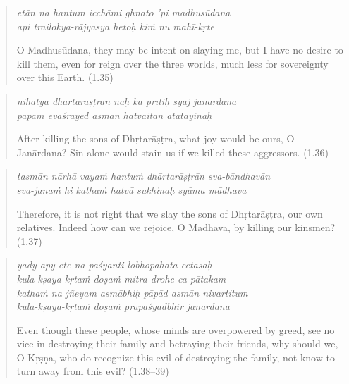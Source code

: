 \documentclass[12pt, twoside, openright]{memoir}
\begin{document}
\par
\begin{verse}
\textit{etān na hantum icchāmi ghnato ’pi madhusūdana} \\
\textit{api trailokya-rājyasya hetoḥ kiṁ nu mahī-kṛte}

\noindent O Madhusūdana, they may be intent on slaying me, but I have no desire to kill them, even for reign over the three worlds, much less for sovereignty over this Earth. (1.35)
\end{verse}
\par



\par
\begin{verse}
\textit{nihatya dhārtarāṣṭrān naḥ kā prītiḥ syāj janārdana} \\
\textit{pāpam evāśrayed asmān hatvaitān ātatāyinaḥ}

\noindent After killing the sons of Dhṛtarāṣṭra, what joy would be ours, O Janārdana? Sin alone would stain us if we killed these aggressors. (1.36)
\end{verse}
\par



\par
\begin{verse}
\textit{tasmān nārhā vayaṁ hantuṁ dhārtarāṣṭrān sva-bāndhavān} \\
\textit{sva-janaṁ hi kathaṁ hatvā sukhinaḥ syāma mādhava}

\noindent Therefore, it is not right that we slay the sons of Dhṛtarāṣṭra, our own relatives. Indeed how can we rejoice, O Mādhava, by killing our kinsmen? (1.37)
\end{verse}
\par



\par
\begin{verse}
\textit{yady apy ete na paśyanti lobhopahata-cetasaḥ} \\
\textit{kula-kṣaya-kṛtaṁ doṣaṁ mitra-drohe ca pātakam} \\
\textit{kathaṁ na jñeyam asmābhiḥ pāpād asmān nivartitum} \\
\textit{kula-kṣaya-kṛtaṁ doṣaṁ prapaśyadbhir janārdana}

\noindent Even though these people, whose minds are overpowered by greed, see no vice in destroying their family and betraying their friends, why should we, O Kṛṣṇa, who do recognize this evil of destroying the family, not know to turn away from this evil? (1.38–39)
\end{verse}
\par
\end{document}
